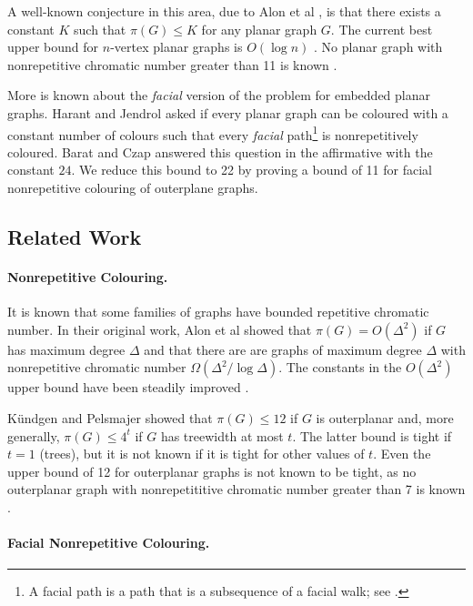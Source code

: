 \documentclass{patmorin}
\begin{document}
A well-known conjecture in this area, due to Alon et al
\cite{alon2002nonrepetitive}, is that there exists a constant
$K$ such that $\pi(G) \leq K$ for any planar graph $G$.
The current best upper bound for $n$-vertex planar graphs is
$O(\log n)$ \cite{dujmovic2012planarlogn}. No planar graph
with nonrepetitive chromatic number greater than 11 is known
\cite[Appendix~A]{dujmovic2012planarlogn}.

More is known about the \emph{facial} version of the problem for embedded
planar graphs.  Harant and Jendrol \cite{harant2012nonrepetitive} asked
if every planar graph can be coloured with a constant number of colours
such that every \emph{facial} path\footnote{A facial path is a path
that is a subsequence of a facial walk; see .} is
nonrepetitively coloured.  Barat and Czap \cite{barat2007square} answered
this question in the affirmative with the constant $24$.  We reduce this
bound to 22 by proving a bound of 11 for facial nonrepetitive colouring
of outerplane graphs.

\subsection{Related Work}

\paragraph{Nonrepetitive Colouring.}
It is known that some families of graphs have bounded repetitive chromatic
number.  In their original work, Alon et al \cite{alon2002nonrepetitive}
showed that $\pi(G) = O(\Delta^2)$ if $G$ has maximum degree
$\Delta$ and that there are are graphs of maximum degree $\Delta$
with nonrepetitive chromatic number $\Omega(\Delta^2/\log \Delta)$.
The constants in the $O(\Delta^2)$ upper bound have been steadily
improved \cite{dujmovic2011nonrepetitive,grytczuk2007nonrepetitive,
grytczuk2007nonrepetitivesurvey,harant2012nonrepetitive}.

K{\"u}ndgen and Pelsmajer \cite{kundgen2008nonrepetitive} showed that
$\pi(G)\le 12$ if $G$ is outerplanar and, more generally, $\pi(G)\le 4^t$
if $G$ has treewidth at most $t$. The latter bound is tight if $t=1$
(trees), but it is not known if it is tight for other values of $t$. Even
the upper bound of 12 for outerplanar graphs is not known to be tight,
as no outerplanar graph with nonrepetititive chromatic number greater
than 7 is known \cite{barat2007square}.

\paragraph{Facial Nonrepetitive Colouring.}
\end{document}
